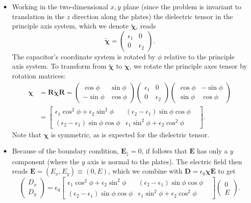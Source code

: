\documentclass[11pt, a4paper]{article}
\renewcommand{\vec}[1]{\bm{#1}} %
\newcommand{\mat}[1]{\mathbf{#1}} %
\renewcommand{\t}[1]{\tilde{#1}} %
\newcommand{\E}{\vec{E}}  %
\newcommand{\D}{\vec{D}}  %
\newcommand{\e}{\epsilon}
\newcommand{\ee}{\epsilon_{0}}  %
\newcommand{\eee}{\bm{\chi}}  %
\begin{document}
\begin{itemize}
	\item Working in the two-dimensional $ x, y $ plane (since the problem is invariant to translation in the $ z $ direction along the plates) the dielectric tensor in the principle axis system, which we denote $ \t{\eee} $, reads
	\begin{equation*}
		\t{\eee} = 
		\begin{pmatrix}
			\e_{1} & 0\\
			0 & \e_{2}
		\end{pmatrix}.
	\end{equation*}
	The capacitor's coordinate system is rotated by $ \phi $ relative to the principle axis system. To transform from $ \t{\eee} $ to $ \eee $, we rotate the principle axes tensor by rotation matrices:
	\begin{align*}
		\eee &= \mat{R} \t{\eee} \mat{R} = 
		\begin{pmatrix}
			\cos \phi & \sin \phi\\
			- \sin \phi & \cos \phi
		\end{pmatrix}
		\begin{pmatrix}
			\e_{1} & 0\\
			0 & \e_{2}
		\end{pmatrix}
		\begin{pmatrix}
			\cos \phi & - \sin \phi\\
			\sin \phi & \cos \phi
		\end{pmatrix}\\
		& = 
		\begin{bmatrix}
			\e_{1} \cos^{2}\phi + \e_{2} \sin^{2}\phi & (\e_{2} - \e_{1})\sin \phi \cos \phi \\
			(\e_{2} - \e_{1})\sin \phi \cos \phi & \e_{1} \sin^{2}\phi + \e_{2} \cos^{2}\phi &
		\end{bmatrix}.
	\end{align*}
	Note that $ \eee $ is symmetric, as is expected for the dielectric tensor.
	
	\item Because of the boundary condition, $ \E_{\parallel} = 0 $, if follows that $ \E $ has only a $ y $ component (where the $ y $ axis is normal to the plates). The electric field then reads $ \E = (E_{x}, E_{y}) \equiv (0, E) $, which we combine with $ \D = \ee \eee \E $ to get
	\begin{equation*}
		\begin{pmatrix}
			D_{x}\\
			D_{y}
		\end{pmatrix}
		 = 
		 \ee 
 		\begin{bmatrix}
 			\e_{1} \cos^{2}\phi + \e_{2} \sin^{2}\phi & (\e_{2} - \e_{1})\sin \phi \cos \phi \\
 			(\e_{2} - \e_{1})\sin \phi \cos \phi & \e_{1} \sin^{2}\phi + \e_{2} \cos^{2}\phi &
 		\end{bmatrix}
		\begin{pmatrix}
			0\\
			E
		\end{pmatrix}.
	\end{equation*}
	

\end{itemize}
\end{document}
